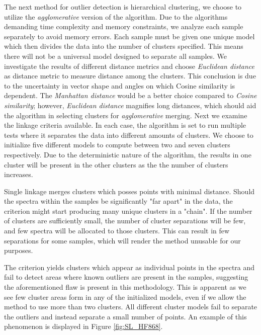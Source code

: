 The next method for outlier detection is hierarchical clustering, we choose to utilize the \textit{agglomerative} version of the algorithm. Due to the algorithms demanding time complexity and memory constraints, we analyze each sample separately to avoid memory errors. Each sample must be given one unique model which then divides the data into  the number of clusters specified. This means there will not be a universal model designed to separate all samples. We investigate the results of different distance metrics and choose \textit{Euclidean distance} as distance metric to measure distance among the clusters. This conclusion is due to the uncertainty in vector shape and angles on which Cosine similarity is dependent. The \textit{Manhattan distance} would be a better choice compared to \textit{Cosine similarity}; however, \textit{Euclidean distance} magnifies long distances, which should aid the algorithm in selecting clusters for \textit{agglomerative} merging. Next we examine the linkage criteria available. In each case, the algorithm is set to run multiple tests where it separates the data into different amounts of clusters. We choose to initialize five different models to compute between two and seven clusters respectively. Due to the deterministic nature of the algorithm, the results in one cluster will be present in the other clusters as the the number of clusters increases.

Single linkage merges clusters which posses points with minimal distance. Should the spectra within the samples be significantly "far apart" in the data, the criterion might start producing many unique clusters in a "chain". If the number of clusters are sufficiently small, the number of cluster separations will be few, and few spectra will be allocated to those clusters. This can result in few separations for some samples, which will render the method unusable for our purposes.

The criterion yields clusters which appear as individual points in the spectra and fail to detect areas where known outliers are present in the samples, suggesting the aforementioned flaw is present in this methodology. This is apparent as we see few cluster areas form in any of the initialized models, even if we allow the method to use more than two clusters. All different cluster models fail to separate the outliers and instead separate a small number of points. An example of this phenomenon is displayed in Figure \ref{fig:SL_HF868}.

